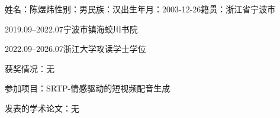 \cleardoublepage
{}

姓名：陈煜炜\quad 性别：男\quad 民族：汉\quad 出生年月：2003-12-26\quad 籍贯：浙江省宁波市

2019.09--2022.07\quad 宁波市镇海蛟川书院

2022.09--2026.07\quad 浙江大学攻读学士学位

获奖情况：无

参加项目：SRTP-情感驱动的短视频配音生成

发表的学术论文：无
